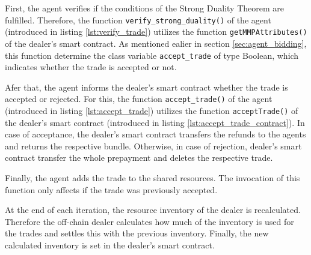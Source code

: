 First, the agent verifies if the conditions of the Strong Duality Theorem
are fulfilled.
Therefore, the function \verb|verify_strong_duality()| of the agent
(introduced in listing \ref{lst:verify_trade})
utilizes the function \verb|getMMPAttributes()| of the dealer's smart contract.
As mentioned ealier in section \ref{sec:agent_bidding}, this function 
determine the class variable \verb|accept_trade| of type Boolean,
which indicates whether the trade is accepted or not.

Afer that, the agent informs the dealer's smart contract whether 
the trade is accepted or rejected.
For this, the function \verb|accept_trade()| of the agent
(introduced in listing \ref{lst:accept_trade})
utilizes the function \verb|acceptTrade()| of the dealer's smart contract
(introduced in listing \ref{lst:accept_trade_contract}).
In case of acceptance, the dealer's smart contract transfers the refunds 
to the agents and returns the respective bundle. Otherwise, in case of  
rejection, dealer's smart contract transfer the whole prepayment 
and deletes the respective trade.

Finally, the agent adds the trade to the shared resources. The invocation
of this function only affects if the trade was previously accepted. \newline

At the end of each iteration, the resource inventory of the dealer is recalculated.
Therefore the off-chain dealer calculates how much of the inventory is used for
the trades and settles this with the previous inventory.
Finally, the new calculated inventory is set in the dealer's smart contract.

\clearpage